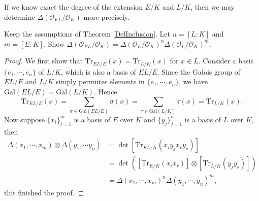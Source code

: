 If we know exact the degree of the extension $E/K$ and $L/K$, then we may determine $\Delta(\mathcal{O}_{EL}/\mathcal{O}_K)$ more precisely.
\begin{proposition}
Keep the assumptions of Theorem \ref{DelInclusion}. Let $n=[L:K]$ and $m=[E:K]$. Show $\Delta(\mathcal{O}_{EL}/\mathcal{O}_K)=\Delta(\mathcal{O}_E/\mathcal{O}_K)^n\Delta(\mathcal{O}_L/\mathcal{O}_K)^m$.
\end{proposition}
\begin{proof}
We first show that $\mathrm{Tr}_{EL/E}(x)=\mathrm{Tr}_{L/K}(x)$ for $x\in L$. Consider a basis $\{e_1,\cdots,e_n\}$ of $L/K$, which is also a basis of $EL/E$. Since the Galois group of $EL/E$ and $L/K$ simply permutes elements in $\{e_1,\cdots,e_n\}$, we have $\mathrm{Gal}(EL/E)=\mathrm{Gal}(L/K)$. Hence 
$$
\mathrm{Tr}_{EL/E}\left( x \right) =\sum_{\sigma \in \mathrm{Gal}\left( EL/E \right)}{\sigma \left( x \right)}=\sum_{\tau \in \mathrm{Gal}\left( L/K \right)}{\tau \left( x \right)}=\mathrm{Tr}_{L/K}\left( x \right) .
$$
Now suppose $\{x_i\}_{i=1}^m$ is a basis of $E$ over $K$ and $\{y_j\}_{j=1}^n$ is a basis of $L$ over $K$, then
$$
\begin{aligned}
\Delta \left( x_1,\cdots ,x_m \right) \otimes \Delta \left( y_1,\cdots y_n \right) &=\det \left[ \mathrm{Tr}_{EL/K}\left( x_iy_jx_ry_s \right) \right] 
\\
&=\det \left( \left[ \mathrm{Tr}_{E/K}\left( x_ix_r \right) \right] \otimes \left[ \mathrm{Tr}_{L/K}\left( y_jy_s \right) \right] \right) 
\\
&=\Delta \left( x_1,\cdots ,x_m \right) ^n\Delta \left( y_1,\cdots ,y_n \right) ^m,
\end{aligned}
$$
this finished the proof.
\end{proof}
